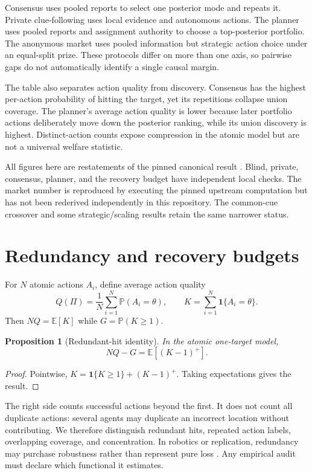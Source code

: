 \documentclass[11pt]{article}
\newtheorem{proposition}{Proposition}
\theoremstyle{remark}
\newcommand{\E}{\mathbb{E}}
\newcommand{\Prob}{\mathbb{P}}
\begin{document}


Consensus uses pooled reports to select one posterior mode and repeats it. Private clue-following uses local evidence and autonomous actions. The planner uses pooled reports and assignment authority to choose a top-posterior portfolio. The anonymous market uses pooled information but strategic action choice under an equal-split prize. These protocols differ on more than one axis, so pairwise gaps do not automatically identify a single causal margin.

The table also separates action quality from discovery. Consensus has the highest per-action probability of hitting the target, yet its repetitions collapse union coverage. The planner's average action quality is lower because later portfolio actions deliberately move down the posterior ranking, while its union discovery is highest. Distinct-action counts expose compression in the atomic model but are not a universal welfare statistic.

All figures here are restatements of the pinned canonical result \citep{Nakajima2026SharedDiscovery}. Blind, private, consensus, planner, and the recovery budget have independent local checks. The market number is reproduced by executing the pinned upstream computation but has not been rederived independently in this repository. The common-cue crossover and some strategic/scaling results retain the same narrower status.

\section{Redundancy and recovery budgets}
For $N$ atomic actions $A_i$, define average action quality
\[
Q(\Pi)=\frac{1}{N}\sum_{i=1}^N\Prob(A_i=\theta),
\qquad
K=\sum_{i=1}^N\mathbf 1\{A_i=\theta\}.
\]
Then $NQ=\E[K]$ while $G=\Prob(K\ge1)$.

\begin{proposition}[Redundant-hit identity]
In the atomic one-target model,
\[
NQ-G=\E[(K-1)^+].
\]
\end{proposition}
\begin{proof}
Pointwise, $K=\mathbf 1\{K\ge1\}+(K-1)^+$. Taking expectations gives the result.
\end{proof}

The right side counts successful actions beyond the first. It does not count all duplicate actions: several agents may duplicate an incorrect location without contributing. We therefore distinguish redundant hits, repeated action labels, overlapping coverage, and concentration. In robotics or replication, redundancy may purchase robustness rather than represent pure loss \citep{HazonKaminka2008}. Any empirical audit must declare which functional it estimates.
\end{document}
